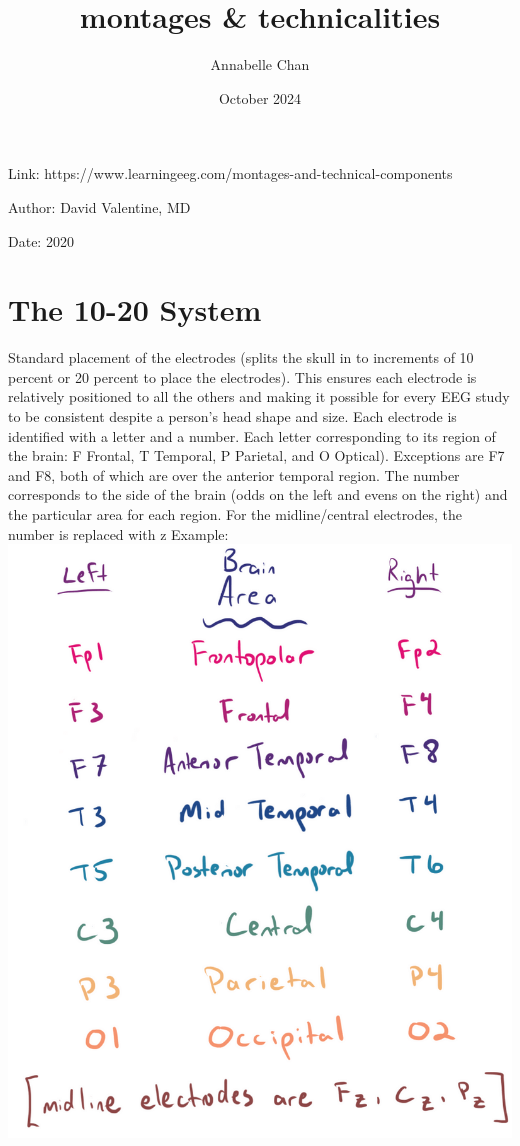 \documentclass[12pt]{article}
\title{montages \& technicalities}
\author{Annabelle Chan}
\date{October 2024}
\begin{document}
\maketitle
Link: https://www.learningeeg.com/montages-and-technical-components

Author: David Valentine, MD

Date: 2020

\section{The 10-20 System} 
Standard placement of the electrodes (splits the skull in to increments of 10 percent or 20 percent to place the electrodes). This ensures each electrode is relatively positioned to all the others and making it possible for every EEG study to be consistent despite a person’s head shape and size. Each electrode is identified with a letter and a number. Each letter corresponding to its region of the brain: F Frontal, T Temporal, P Parietal, and O Optical). Exceptions are F7 and F8, both of which are over the anterior temporal region. The number corresponds to the side of the brain (odds on the left and evens on the right) and the particular area for each region. For the midline/central electrodes, the number is replaced with z
Example:
\includegraphics[scale=0.4]{montage1020system1}
\end{document}
